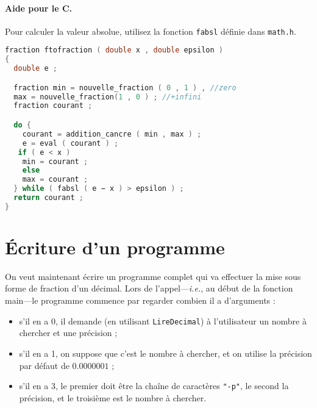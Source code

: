 \paragraph{Aide pour le C.} Pour
calculer la valeur absolue, utilisez la fonction \texttt{fabsl} définie dans
\texttt{math.h}.  

\begin{solution}
  \begin{lstlisting}[language=C]
fraction ftofraction ( double x , double epsilon ) 
{ 
  double e ;

  fraction min = nouvelle_fraction ( 0 , 1 ) , //zero
  max = nouvelle_fraction(1 , 0 ) ; //+infini
  fraction courant ;

  do {
    courant = addition_cancre ( min , max ) ;
    e = eval ( courant ) ; 
   if ( e < x )
    min = courant ;
    else
    max = courant ;
  } while ( fabsl ( e − x ) > epsilon ) ;
  return courant ;
}
\end{lstlisting}
\end{solution}



\section{Écriture d’un programme}

On veut maintenant écrire un programme complet qui va effectuer la
mise sous forme de fraction d’un décimal. Lors de
l’appel---\textit{i.e.}, au début de la fonction main---le programme
commence par regarder combien il a d’arguments :
\begin{itemize}
\item s’il en a 0, il demande (en utilisant \texttt{LireDecimal}) à
  l’utilisateur un nombre à chercher et une précision ;
\item s’il en a 1, on suppose que c’est le nombre à chercher, et on
  utilise la précision par défaut de \(0.0000001\) ;
\item s’il en a 3, le premier doit être la chaîne de caractères
  \texttt{"-p"}, le second la précision, et le troisième est le nombre
  à chercher.
\end{itemize}


